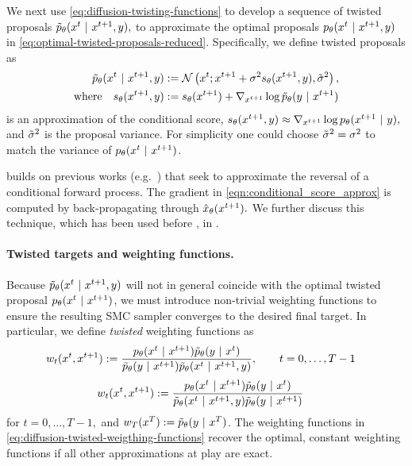 We next use \cref{eq:diffusion-twisting-functions}
to develop a sequence of twisted proposals $\tilde p_\theta(x^{t} ~\vert~ x^{t+1}, y),$ to approximate the optimal proposals $p_{\theta}(x^{t} ~\vert~ x^{t+1}, y)$ in \cref{eq:optimal-twisted-proposals-reduced}.
Specifically, we define twisted proposals as
\begin{align}\label{eq:diffusion-twisted-proposals}
    \tilde p_\theta(x^{t} ~\vert~ x^{t+1}, y) &:= \mathcal{N} \left(x^{t}; x^{t+1} + \sigma^2 s_\theta(x^{t+1}, y), \tilde \sigma^2 \right), \\
\mathrm{where}\quad s_\theta(x^{t+1}, y) &:= s_\theta(x^{t+1}) + \nabla_{x^{t+1}} \log  \tilde p_\theta (y~\vert~ x^{t+1})\label{eqn:conditional_score_approx}
\end{align}
is an approximation of the conditional score, $s_\theta(x^{t+1}, y) \approx \nabla_{x^{t+1}} \log p_{\theta}(x^{t+1} ~\vert~ y),$ and
$\tilde \sigma^2$ is the proposal variance.
For simplicity one could choose $\tilde \sigma^2=\sigma^2$ to match the variance of $p_{\theta} (x^{t} ~\vert~ x^{t+1})$.

 builds on previous works (e.g.\ \citep{song2020score,shi2022conditional}) that seek to approximate the reversal of a conditional forward process.
The gradient in \cref{eqn:conditional_score_approx} is computed by back-propagating through  ${\hat x}_\theta(x^{t+1}).$
We further discuss this technique, which has been used before \citep[e.g.\ in][]{hovideo,song2023pseudoinverse}, in . 


\paragraph{Twisted targets and weighting functions.} 
Because $\tilde p_\theta(x^{t} ~\vert~ x^{t+1}, y)$ will not in general coincide with the optimal twisted proposal $p_{\theta} (x^{t} ~\vert~ x^{t+1})$, 
we must introduce non-trivial weighting functions to ensure the resulting SMC sampler converges to the desired final target.
In particular, we define \emph{twisted} weighting functions as 
\ifnum{}
\begin{align}\label{eq:diffusion-twisted-weigthing-functions}
    &\weight_t (\xt , \xtpo ):= \frac{\pmodel (\xt \mid \xtpo) \twist(y \mid \xt)}{\twist(y \mid \xtpo) \pTwist(\xt \mid \xtpo, y)}, \qquad t=0,\dots, T-1 %
\end{align}
\else
\begin{align}\label{eq:diffusion-twisted-weigthing-functions}
    &w_t (x^{t} , x^{t+1} ):= \frac{p_{\theta} (x^{t} ~\vert~ x^{t+1}) \tilde p_\theta(y ~\vert~ x^{t})}{
    \tilde p_\theta(x^{t} ~\vert~ x^{t+1}, y)\tilde p_\theta(y ~\vert~ x^{t+1})}
\end{align}
for $t=0,\dots, T-1,$
\fi
and $w_T (x^{T}) := \tilde p_\theta(y ~\vert~ x^{T})$. 
The weighting functions in \cref{eq:diffusion-twisted-weigthing-functions} recover the optimal, constant weighting functions if all other approximations at play are exact. 


